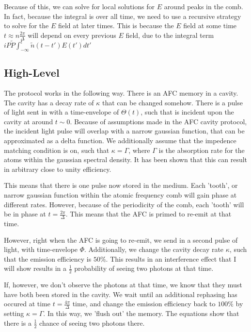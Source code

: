 \documentclass[12pt]{article}
\begin{document}
Because of this, we can solve for local solutions for $E$ around peaks in the comb. In fact,
because the integral is over all time, we need to use a recursive strategy to solve
for the $E$ field at later times. This is because the $E$ field at some time $t \approx n\frac{2\pi}{\Delta}$ will depend
	on every previous $E$ field, due to the integral term $ i P\tilde{P} \int^t_{-\infty} \tilde{n}(t-t') E(t') d t'$


\subsection{High-Level}
\label{description}
The protocol works in the following way. There is an AFC memory in a cavity. The cavity has a decay rate of $\kappa$ that can be changed somehow. There is a pulse of light sent in with a time-envelope of $\Theta(t)$, such that is incident
upon the cavity at around $t\sim0$. Because of assumptions made in the AFC cavity protocol, the incident light pulse will
overlap with a narrow gaussian function, that can be approximated as a delta function. We additionally assume that the
impedence matching condition is on, such that $\kappa = \Gamma$, where $\Gamma$ is the absorption rate for the atoms within the gaussian spectral density. It has been shown that this can result in arbitrary close to unity efficiency. 

This means that there is one pulse now stored in the medium. Each 'tooth', or narrow gaussian function within the atomic
frequency comb will gain phase at different rates. However, because of the periodicity of the comb, each 'tooth' will
be in phase at $t = \frac{2 \pi}{\Delta}$. This means that the AFC is primed to re-emit at that time. 

However, right when the AFC is going to re-emit, we send in a second pulse of light, with time-envelope $\Phi$. Additionally, we change the cavity decay rate $\kappa$, such that the emission efficiency is $50\%$. This results in an interference
effect that I will show results in a $\frac{1}{2}$ probability of seeing two photons at that time.

If, however, we don't observe the photons at that time, we know that they must have both been stored in the cavity. We wait until an additional rephasing has occured at time $t = \frac{4\pi}{\Delta}$ time, and change the emission efficiency back to $100\%$ by setting $\kappa = \Gamma$. In this way, we 'flush out' the memory. The equations show that there is a $\frac{1}{2}$ chance of seeing two photons there.
\end{document}
